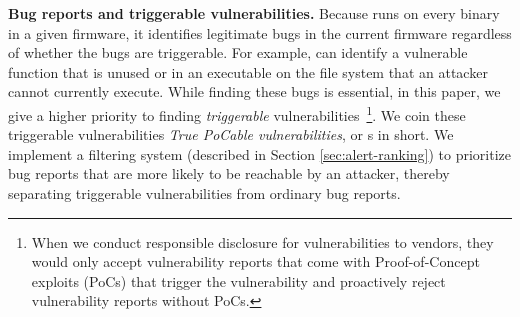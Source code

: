 \smallskip
\noindent
\textbf{Bug reports and triggerable vulnerabilities.}
Because \mango runs on every binary in a given firmware, it identifies legitimate bugs in the current firmware regardless of whether the bugs are triggerable.
For example, \mango can identify a vulnerable function that is unused or in an executable on the file system that an attacker cannot currently execute.
While finding these bugs is essential, in this paper, we give a higher priority to finding \emph{triggerable} vulnerabilities~\footnote{When we conduct responsible disclosure for vulnerabilities to vendors, they would only accept vulnerability reports that come with Proof-of-Concept exploits (PoCs) that trigger the vulnerability and proactively reject vulnerability reports without PoCs.}.
We coin these triggerable vulnerabilities \emph{True PoCable vulnerabilities}, or \emph{\trupoc}s in short.
We implement a filtering system (described in Section \ref{sec:alert-ranking}) to prioritize bug reports that are more likely to be reachable by an attacker, thereby separating triggerable vulnerabilities from ordinary bug reports.

